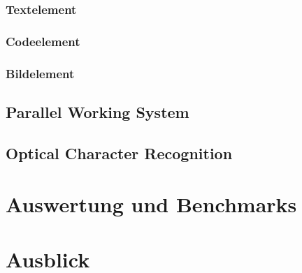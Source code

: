 \documentclass[12pt]{article}
\begin{document}
\subsubsection{Textelement}
\label{subsubsec:textelement}


\newpage

\subsubsection{Codeelement}
\label{subsubsec:codeelement}


\newpage

\subsubsection{Bildelement}
\label{subsubsec:bildelement}


\newpage

\subsection{Parallel Working System}
\label{subsec:parallelws}


\newpage

\subsection{Optical Character Recognition}
\label{subsec:ocr}


\newpage %

\section{Auswertung und Benchmarks}
\label{sec:auswertung}


\newpage %

\section{Ausblick}
\label{sec:ausblick}


\newpage %
\end{document}
